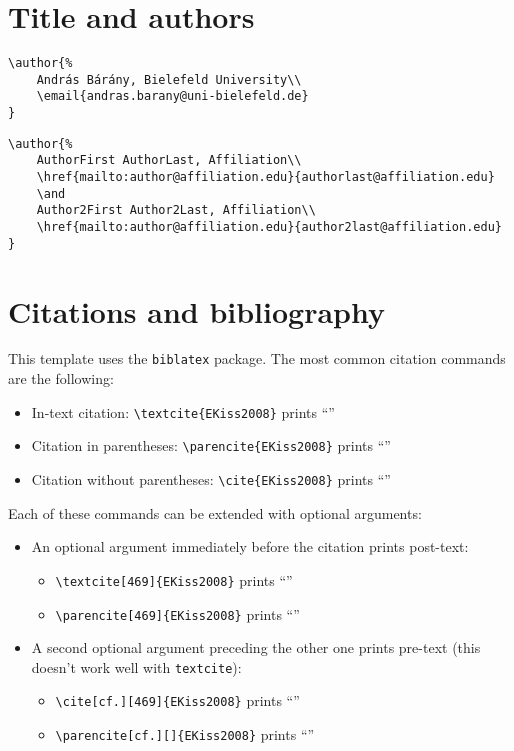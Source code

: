 \section{Title and authors}

\begin{verbatim}
\author{%
    András Bárány, Bielefeld University\\
    \email{andras.barany@uni-bielefeld.de}
}
\end{verbatim}

\begin{verbatim}
\author{%
    AuthorFirst AuthorLast, Affiliation\\
    \href{mailto:author@affiliation.edu}{authorlast@affiliation.edu}
    \and
    Author2First Author2Last, Affiliation\\
    \href{mailto:author@affiliation.edu}{author2last@affiliation.edu}
}
\end{verbatim}

\section{Citations and bibliography}\label{sec:bibliography}

This template uses the \texttt{biblatex} package. The most common citation
commands are the following:

\begin{itemize}
    \item In-text citation: \verb+\textcite{EKiss2008}+ prints \enquote{\textcite{EKiss2008}}
    \item Citation in parentheses: \verb+\parencite{EKiss2008}+ prints \enquote{\parencite{EKiss2008}}
    \item Citation without parentheses: \verb+\cite{EKiss2008}+ prints \enquote{\cite{EKiss2008}}
\end{itemize}

Each of these commands can be extended with optional arguments:

\begin{itemize}
    \item An optional argument immediately before the citation prints post-text:
    \begin{itemize}
        \item \verb+\textcite[469]{EKiss2008}+ prints \enquote{\textcite[469]{EKiss2008}}
        \item \verb+\parencite[469]{EKiss2008}+ prints \enquote{\parencite[469]{EKiss2008}}
    \end{itemize}
    \item A second optional argument preceding the other one prints pre-text (this doesn't work well with \verb+textcite+):
    \begin{itemize}
        \item \verb+\cite[cf.][469]{EKiss2008}+ prints \enquote{\cite[cf.][469]{EKiss2008}}
        \item \verb+\parencite[cf.][]{EKiss2008}+ prints \enquote{\parencite[cf.][]{EKiss2008}}
    \end{itemize}
\end{itemize}

